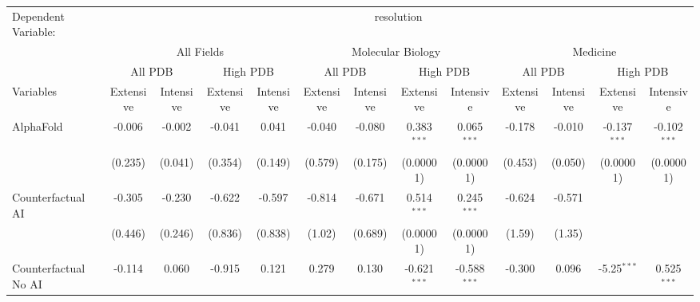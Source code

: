 \begingroup
\centering
\begin{tabular}{lcccccccccccc}
   \tabularnewline \midrule \midrule
   Dependent Variable: & \multicolumn{12}{c}{resolution}\\
 & \multicolumn{4}{c}{All Fields} & \multicolumn{4}{c}{Molecular Biology} & \multicolumn{4}{c}{Medicine} \\
\cmidrule(lr){2-5} \cmidrule(lr){6-9} \cmidrule(lr){10-13}
 & \multicolumn{2}{c}{All PDB} & \multicolumn{2}{c}{High PDB} & \multicolumn{2}{c}{All PDB} & \multicolumn{2}{c}{High PDB} & \multicolumn{2}{c}{All PDB} & \multicolumn{2}{c}{High PDB} \\
\cmidrule(lr){2-3} \cmidrule(lr){4-5} \cmidrule(lr){6-7} \cmidrule(lr){8-9} \cmidrule(lr){10-11} \cmidrule(lr){12-13}
Variables & \multicolumn{1}{c}{Extensive} & \multicolumn{1}{c}{Intensive} & \multicolumn{1}{c}{Extensive} & \multicolumn{1}{c}{Intensive} & \multicolumn{1}{c}{Extensive} & \multicolumn{1}{c}{Intensive} & \multicolumn{1}{c}{Extensive} & \multicolumn{1}{c}{Intensive} & \multicolumn{1}{c}{Extensive} & \multicolumn{1}{c}{Intensive} & \multicolumn{1}{c}{Extensive} & \multicolumn{1}{c}{Intensive} \\
\cmidrule(lr){1-1}\cmidrule(lr){2-2} \cmidrule(lr){3-3} \cmidrule(lr){4-4} \cmidrule(lr){5-5} \cmidrule(lr){6-6} \cmidrule(lr){7-7} \cmidrule(lr){8-8} \cmidrule(lr){9-9} \cmidrule(lr){10-10} \cmidrule(lr){11-11} \cmidrule(lr){12-12} \cmidrule(lr){13-13}
   AlphaFold                                & -0.006  & -0.002  & -0.041  & 0.041   & -0.040  & -0.080  & 0.383$^{***}$  & 0.065$^{***}$  & -0.178  & -0.010      & -0.137$^{***}$ & -0.102$^{***}$\\   
                                            & (0.235) & (0.041) & (0.354) & (0.149) & (0.579) & (0.175) & (0.00001)      & (0.00001)      & (0.453) & (0.050)     & (0.00001)      & (0.00001)\\   
   Counterfactual AI                        & -0.305  & -0.230  & -0.622  & -0.597  & -0.814  & -0.671  & 0.514$^{***}$  & 0.245$^{***}$  & -0.624  & -0.571      &                &   \\   
                                            & (0.446) & (0.246) & (0.836) & (0.838) & (1.02)  & (0.689) & (0.00001)      & (0.00001)      & (1.59)  & (1.35)      &                &   \\   
   Counterfactual No AI                     & -0.114  & 0.060   & -0.915  & 0.121   & 0.279   & 0.130   & -0.621$^{***}$ & -0.588$^{***}$ & -0.300  & 0.096       & -5.25$^{***}$  & 0.525$^{***}$\\   

\end{tabular}
